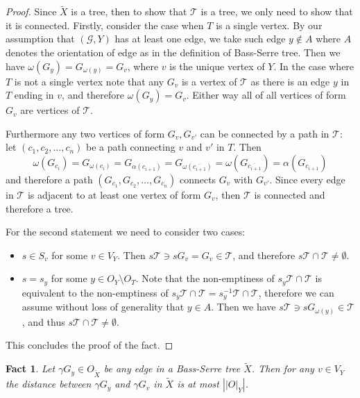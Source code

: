 \documentclass[12pt, a4paper]{article}
\newcommand{\8}{\infty}
\newcommand{\abs}[1]{\left| #1 \right|}
\theoremstyle{break}
\newtheorem{fact}[thm]{Fact}
\theoremstyle{defbreak}
\newcommand{\ol}[1]{\overline{#1}}
\newcommand{\wtl}[1]{\widetilde{#1}}
\begin{document}
\begin{proof}
    Since $\wtl{X}$ is a tree, then to show that $\mathcal{T}$ is a tree, we only need to show that it is connected. Firstly, consider the case when $T$ is a single vertex. By our assumption that $(\mathcal{G}, Y)$ has at least one edge, we take such edge $y\not\in A$ where $A$ denotes the orientation of edge as in the definition of Bass-Serre tree. Then we have $\omega(G_y) = G_{\omega(y)} = G_v$, where $v$ is the unique vertex of $Y$. In the case where $T$ is not a single vertex note that any $G_v$ is a vertex of $\mathcal{T}$ as there is an edge $y$ in $T$ ending in $v$, and therefore $\omega(G_y)=G_v$. Either way all of all vertices of form $G_v$ are vertices of $\mathcal{T}$. 
    
    Furthermore any two vertices of form $G_v,G_{v'}$ can be connected by a path in $\mathcal{T}$: let $(c_1, c_2, \ldots, c_n)$ be a path connecting $v$ and $v'$ in $T$. Then
    $$\omega(G_{c_i}) = G_{\omega(c_i)} = G_{\alpha(c_{i+1})} = G_{\omega(\ol{c_{i+1}})}=\omega(G_{\ol{c_{i+1}}}) = \alpha(G_{c_{i+1}})$$ 
    and therefore a path $(G_{c_1}, G_{c_2}, \ldots,G_{c_n})$ connects $G_v$ with $G_{v'}$. Since every edge in $\mathcal{T}$ is adjacent to at least one vertex of form $G_v$, then $\mathcal{T}$ is connected and therefore a tree.

    For the second statement we need to consider two cases:
    \begin{itemize}
        \item $s\in S_v$ for some $v\in V_Y$. Then $s\mathcal{T}\ni sG_v = G_v\in \mathcal{T}$, and therefore $s\mathcal{T}\cap\mathcal{T}\neq \emptyset$.
        \item $s = s_y$ for some $y\in O_Y\setminus O_T$. Note that the non-emptiness of $s_y\mathcal{T}\cap \mathcal{T}$ is equivalent to the non-emptiness of $s_{\ol{y}}\mathcal{T}\cap\mathcal{T} = s_y^{-1}\mathcal{T}\cap\mathcal{T}$, therefore we can assume without loss of generality that $y\in A$. Then we have $s\mathcal{T}\ni sG_{\omega(y)}\in \mathcal{T}$, and thus $s\mathcal{T}\cap\mathcal{T}\neq \emptyset$.
    \end{itemize}
    This concludes the proof of the fact.
\end{proof}


\begin{fact}\label{fact:distance_edge_and_vertex}
    Let $\gamma G_y \in O_{\wtl{X}}$ be any edge in a Bass-Serre tree $\wtl{X}$. Then for any $v\in V_Y$ the distance between $\gamma G_y$ and $\gamma G_v$ in $\wtl{X}$ is at most $\abs{\abs{O}_Y}$.
\end{fact}
\end{document}
